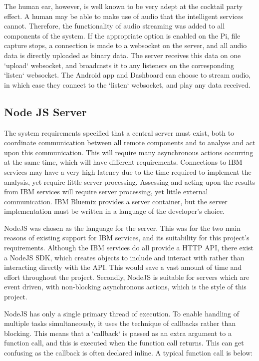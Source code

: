 \documentclass{article}
\begin{document}
The human ear, however, is well known to be very adept at the cocktail party effect\cite{cocktailParty}. A human may be able to make use of audio that the intelligent services cannot. Therefore, the functionality of audio streaming was added to all components of the system. If the appropriate option is enabled on the Pi, file capture stops, a connection is made to a websocket on the server, and all audio data is directly uploaded as binary data. The server receives this data on one `upload` websocket, and broadcasts it to any listeners on the corresponding `listen` websocket. The Android app and Dashboard can choose to stream audio, in which case they connect to the `listen` websocket, and play any data received.

\subsection{Node JS Server}
The system requirements specified that a central server must exist, both to coordinate communication between all remote components and to analyse and act upon this communication. This will require many asynchronous actions occurring at the same time, which will have different requirements. Connections to IBM services may have a very high latency due to the time required to implement the analysis, yet require little server processing. Assessing and acting upon the results from IBM services will require server processing, yet little external communication. IBM Bluemix provides a server container, but the server implementation must be written in a language of the developer's choice. 

NodeJS was chosen as the language for the server. This was for the two main reasons of existing support for IBM services, and its suitability for this project's requirements. Although the IBM services do all provide a HTTP API, there exist a NodeJS SDK, which creates objects to include and interact with rather than interacting directly with the API\cite{githubWatsonCloud}\cite{githubCloudant}\cite{githubDB2}. This would save a vast amount of time and effort throughout the project. Secondly, NodeJS is suitable for servers which are event driven, with non-blocking asynchronous actions\cite{smackdownPHPNodejs}, which is the style of this project.

NodeJS has only a single primary thread of execution. To enable handling of multiple tasks simultaneously, it uses the technique of callbacks rather than blocking. This means that a `callback` is passed as an extra argument to a function call, and this is executed when the function call returns. This can get confusing as the callback is often declared inline. A typical function call is below:
\end{document}
